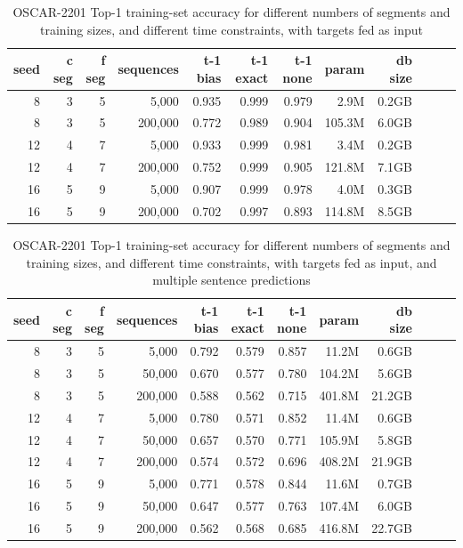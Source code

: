 \begin{table}[H]
\centering
\caption{OSCAR-2201 Top-1 training-set accuracy for different numbers of segments and training sizes, and different time constraints, with targets fed as input}
\label{tab:oscar-train-top1-accuracy-useBenchmarkDefaultsFalse}
\begin{tabular}{rrrrrrrrrrrr}
\toprule
\textbf{seed} & \textbf{c seg} & \textbf{f seg} & \textbf{sequences} & \textbf{t-1 bias} & \textbf{t-1 exact} & \textbf{t-1 none} & \textbf{param} & \textbf{db size} \\
\midrule
8 & 3 & 5 & 5,000     & 0.935 & 0.999 & 0.979 & 2.9M & 0.2GB \\
8 & 3 & 5 & 200,000   & 0.772 & 0.989 & 0.904 & 105.3M & 6.0GB \\
12 & 4 & 7 & 5,000    & 0.933 & 0.999 & 0.981 & 3.4M & 0.2GB \\
12 & 4 & 7 & 200,000  & 0.752 & 0.999 & 0.905 & 121.8M & 7.1GB \\
16 & 5 & 9 & 5,000    & 0.907 & 0.999 & 0.978 & 4.0M & 0.3GB \\
16 & 5 & 9 & 200,000  & 0.702 & 0.997 & 0.893 & 114.8M & 8.5GB \\
\bottomrule
\end{tabular}
\end{table}

\begin{table}[H]
\centering
\caption{OSCAR-2201 Top-1 training-set accuracy for different numbers of segments and training sizes, and different time constraints, with targets fed as input, and multiple sentence predictions}
\label{tab:oscar-train-top1-accuracy-useBenchmarkDefaultsFalse-multisentencePredictions}
\begin{tabular}{rrrrrrrrrrrr}
\toprule
\textbf{seed} & \textbf{c seg} & \textbf{f seg} & \textbf{sequences} & \textbf{t-1 bias} & \textbf{t-1 exact} & \textbf{t-1 none} & \textbf{param} & \textbf{db size} \\
\midrule
8 & 3 & 5 & 5,000     & 0.792 & 0.579 & 0.857 & 11.2M & 0.6GB \\
8 & 3 & 5 & 50,000    & 0.670 & 0.577 & 0.780 & 104.2M & 5.6GB \\
8 & 3 & 5 & 200,000   & 0.588 & 0.562 & 0.715 & 401.8M & 21.2GB \\
12 & 4 & 7 & 5,000    & 0.780 & 0.571 & 0.852 & 11.4M & 0.6GB \\
12 & 4 & 7 & 50,000   & 0.657 & 0.570 & 0.771 & 105.9M & 5.8GB \\
12 & 4 & 7 & 200,000  & 0.574 & 0.572 & 0.696 & 408.2M & 21.9GB \\
16 & 5 & 9 & 5,000    & 0.771 & 0.578 & 0.844 & 11.6M & 0.7GB \\
16 & 5 & 9 & 50,000   & 0.647 & 0.577 & 0.763 & 107.4M & 6.0GB \\
16 & 5 & 9 & 200,000  & 0.562 & 0.568 & 0.685 & 416.8M & 22.7GB \\
\bottomrule
\end{tabular}
\end{table}

